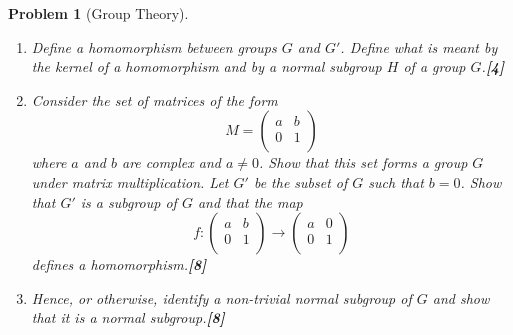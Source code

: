 \documentclass[a4paper]{article}
\theoremstyle{new}
\newtheorem{qns}{Problem}[section]
\begin{document}
\begin{qns}[Group Theory]\leavevmode
\begin{enumerate}[label=(\alph*)]
\item Define a homomorphism between groups $G$ and $G'$. Define what is meant by the kernel of a homomorphism and by a normal subgroup $H$ of a group $G$.\hfill\textbf{[4]}
\item Consider the set of matrices of the form
$$M=\begin{pmatrix}a&b\\0&1\\\end{pmatrix}$$
where $a$ and $b$ are complex and $a\neq 0$. Show that this set forms a group $G$ under matrix multiplication. Let $G'$ be the subset of $G$ such that $b = 0$. Show that $G'$ is a subgroup of $G$ and that the map 
$$f:\begin{pmatrix}a&b\\0&1\\\end{pmatrix}\rightarrow\begin{pmatrix}a&0\\0&1\\\end{pmatrix}$$
defines a homomorphism.\hfill\textbf{[8]}
\item Hence, or otherwise, identify a non-trivial normal subgroup of $G$ and show that it is a normal subgroup.\hfill\textbf{[8]}
\end{enumerate}
\end{qns}
\newpage
\end{document}
